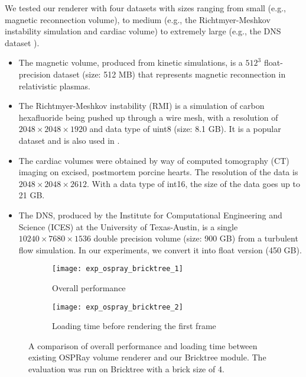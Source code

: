 We tested our renderer with four datasets with sizes ranging from small (e.g., magnetic 
reconnection volume\cite{guo2014formation}), to medium (e.g., the Richtmyer-Meshkov instability simulation
\cite{cohen2002three} and cardiac volume\cite{scivisdata}) to extremely large (e.g., the DNS dataset \cite{moser1999direct}).
\begin{itemize}
\item The magnetic volume, produced from kinetic simulations, is a $512^3$ float-precision dataset
(size: 512 MB) that represents magnetic reconnection in relativistic plasmas. 
\item The Richtmyer-Meshkov instability (RMI) is a simulation of carbon hexafluoride being pushed up through a wire mesh, with a resolution of $2048 \times 2048 \times 1920$ and data type of uint8 (size: 8.1 GB). It is a popular dataset and is also used in \cite{fogal2013analysis, wu2018visit, knoll2006interactive}. 
\item The cardiac volumes were obtained by way of computed tomography (CT) imaging on excised,
postmortem porcine hearts. The resolution of the data is $2048 \times 2048 \times 2612$. With a data
type of int16, the size of the data goes up to 21 GB. 
\item The DNS, produced by the Institute for Computational Engineering and Science (ICES) at the
	University of Texas-Austin, is a single $10240 \times 7680 \times 1536$ double precision volume (size: 900 GB) from a turbulent flow simulation. In our experiments, we convert it into float version (450 GB).  
\end{itemize}

\begin{figure}[h]
    \centering
    \begin{subfigure}[b]{0.9\columnwidth}
        \texttt{[image: exp\_ospray\_bricktree\_1]}
        \vspace{-1em}
        \caption{Overall performance}
        \label{fig:exp_ospray_bricktree_framerate}
    \end{subfigure}
    \begin{subfigure}[b]{0.9\columnwidth}
        \texttt{[image: exp\_ospray\_bricktree\_2]}
        \vspace{-1em}
        \caption{Loading time before rendering the first frame}
        \label{fig:exp_ospray_bricktree_waitingtime}
    \end{subfigure}
	\caption{\label{fig:exp_ospray_bricktree}%
	A comparison of overall performance and loading time between existing OSPRay volume renderer and our Bricktree module. The evaluation was run on Bricktree with a brick size of 4.}
	\vspace{-1em}
\end{figure}

